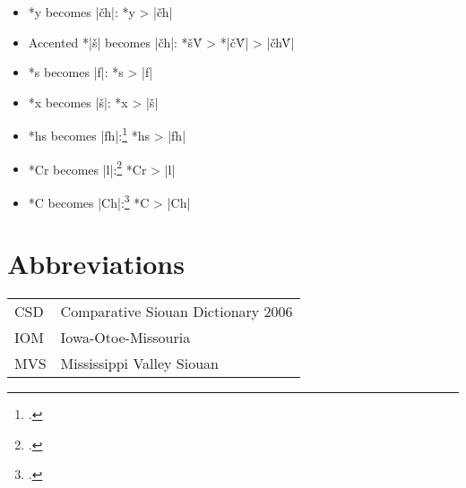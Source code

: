 \documentclass[output=paper]{LSP/langsci}
\begin{document}
\begin{itemize}
\item *y becomes |\v{c}h|: \hspace{5em} *y	>	|\v{c}h|
\item Accented *|š| becomes |\v{c}h|: \hspace{1em} *š\'V	>	*|\v{c}\'V|	>	|\v{c}h\'V|
\item *s becomes |f|: \hspace{6em} *s	>	|f|
\item *x becomes |š|: \hspace{6em} 	*x	>	|š|
\item *hs becomes |fh|:\footnote{\citealt[174, 299]{Rankinetal2006PDF}.}  \hspace{4.8em} 			*hs	>	|fh|
\item *Cr becomes |l|:\footnote{\citealt[90]{Rankinetal2006PDF}.}  \hspace{5em} 			*Cr	>	|l|
\item *C\textsuperscript{} becomes |Ch|:\footnote{\citealt[229, 232]{Rankinetal2006PDF}.}  \hspace{3.9em} *C\textsuperscript{}	>	|Ch|
\end{itemize}

\section*{Abbreviations}
\begin{tabularx}{\textwidth}{lX}
CSD & {Comparative Siouan Dictionary} 2006\\
IOM & Iowa-Otoe-Missouria\\
MVS & {Mississippi Valley Siouan}
\end{tabularx}


 
{\sloppy
\printbibliography[heading=subbibliography,notkeyword=this]
 }
\end{document}

